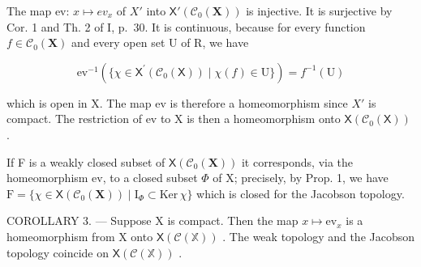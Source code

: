 The map ev: \(x \mapsto ev_{x}\) of \(X'\) into \(\mathsf{X}'(\mathcal{C}_{0}(\mathbf{X}))\) is injective. It is surjective by Cor. 1 and Th. 2 of I, p.~30. It is continuous, because for every function \(f \in \mathcal{C}_{0}(\mathbf{X})\) and every open set U of R, we have

\[
\mathrm{ev} ^ {- 1} (\{\chi \in \mathsf {X} ^ {\prime} (\mathcal {C} _ {0} (\mathsf {X})) \mid \chi (f) \in \mathrm{U} \}) = f ^ {- 1} (\mathrm{U})
\]

which is open in X. The map ev is therefore a homeomorphism since \(X'\) is compact. The restriction of ev to X is then a homeomorphism onto \(\mathsf{X}(\mathcal{C}_{0}(\mathsf{X}))\) .

If F is a weakly closed subset of \(\mathsf{X}(\mathcal{C}_{0}(\mathbf{X}))\) it corresponds, via the homeomorphism ev, to a closed subset \(\Phi\) of X; precisely, by Prop. 1, we have \(\mathrm{F} = \{\chi \in \mathsf{X}(\mathcal{C}_{0}(\mathbf{X})) \mid \mathrm{I}_{\Phi} \subset \mathrm{Ker} \, \chi\}\) which is closed for the Jacobson topology.

COROLLARY 3. --- Suppose X is compact. Then the map \(x \mapsto \mathrm{ev}_x\) is a homeomorphism from X onto \(\mathsf{X}(\mathcal{C}(\mathbb{X}))\) . The weak topology and the Jacobson topology coincide on \(\mathsf{X}(\mathcal{C}(\mathbb{X}))\) .
\relax{}
